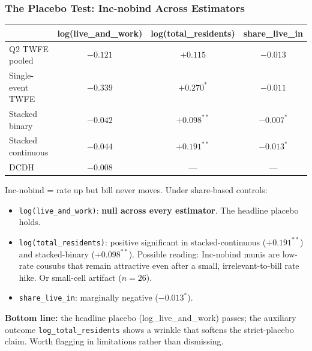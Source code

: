 \documentclass[xcolor = x11names, compress, aspectratio = 169]{beamer}
\begin{document}
    \begin{frame}
    \frametitle{The Placebo Test: Inc-nobind Across Estimators}
        \centering
        \footnotesize
        \renewcommand{\arraystretch}{1.20}
        \setlength{\tabcolsep}{8pt}
        \begin{tabular}{lccc}
            \toprule
            & log(live\_and\_work) & log(total\_residents) & share\_live\_in \\
            \midrule
            Q2 TWFE pooled        & $-0.121$      & $+0.115$       & $-0.013$ \\
            Single-event TWFE     & $-0.339$      & $+0.270^{*}$   & $-0.011$ \\
            Stacked binary        & $-0.042$      & $+0.098^{**}$  & $-0.007^{*}$ \\
            Stacked continuous    & $-0.044$      & $+0.191^{**}$  & $-0.013^{*}$ \\
            DCDH                  & $-0.008$      & ---            & --- \\
            \bottomrule
        \end{tabular}
        \medskip

        \footnotesize
        \alert{Inc-nobind} = rate up but bill never moves. Under share-based controls:
        \begin{itemize}\setlength{\itemsep}{0.02cm}\scriptsize
            \item \texttt{log(live\_and\_work)}: \textbf{null across every estimator}.
            The headline placebo holds.
            \item \texttt{log(total\_residents)}: positive significant in stacked-continuous
            ($+0.191^{**}$) and stacked-binary ($+0.098^{**}$). Possible reading: Inc-nobind
            munis are low-rate cousubs that remain attractive even after a small,
            irrelevant-to-bill rate hike. Or small-cell artifact ($n=26$).
            \item \texttt{share\_live\_in}: marginally negative ($-0.013^{*}$).
        \end{itemize}
        \textbf{Bottom line:} the headline placebo (log\_live\_and\_work)
        passes; the auxiliary outcome \texttt{log\_total\_residents} shows a
        wrinkle that softens the strict-placebo claim. Worth flagging in
        limitations rather than dismissing.
    \end{frame}
\end{document}
